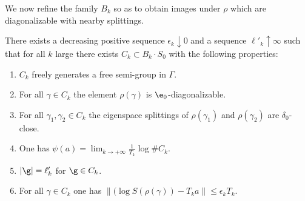 We now refine the family \(B_k\) so as to obtain images under \(\rho\) which are diagonalizable with nearby splittings.
\begin{lemma}\label{bklemma}
There exists a decreasing positive sequence \(\epsilon_k \downarrow 0\) and a sequence \(\ell '_k \uparrow \infty \) such that for all \(k\) large there exists \(C_k \subset B_k\cdot S_0\) with the following properties:
\begin{enumerate}
\item\label{bklemma1} \(C_k\) freely generates a free semi-group in \(\Gamma\).
\item\label{bklemma2} For all \(\gamma \in C_k\) the element \(\rho(\gamma)\) is \(\e_0\)-diagonalizable.
\item\label{bklemma3} For all \(\gamma_1,\gamma_2 \in C_k\) the eigenspace splittings of \(\rho(\gamma_1)\) and \(\rho(\gamma_2)\) are \(\delta_0\)-close.
\item\label{bklemma4} One has \(\psi(a) = \lim_{k\to +\infty}\frac{1}{T_k}\log \# C_k\).
\item\label{bklemma5} \(|\g| = \ell '_k \) for \(\g \in C_k \).
\item\label{bklemma6} For all \(\gamma \in C_k\) one has \(\|(\log S(\rho(\gamma)) - T_k a\| \le \epsilon_k T_k\).
\end{enumerate}
\end{lemma}
